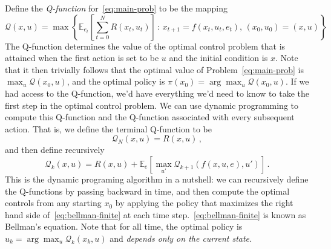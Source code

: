 \documentclass[11pt]{article}
\newcommand{\eq}[1]{\eqref{eq:#1}}
\newcommand{\eqd}[1]{\eqref{eq:#1}}
\numberwithin{equation}{section}
\newcommand{\E}{\mathbb{E}}
\begin{document}
Define the \emph{Q-function} for~\eq{main-prob} to be the mapping 
\begin{equation}\label{eq:q-fun}
	\mathcal{Q}(x,u) = \max\left\{ \E_{e_t}\left[ \sum_{t=0}^N R(x_t,u_t)\right] \,:\,x_{t+1} = f(x_t, u_t, e_t),\,(x_0,u_0)=(x,u)\right\}
\end{equation}
The Q-function determines the value of the optimal control problem that is attained when the first action is set to be $u$ and the initial condition is $x$. Note that it then trivially follows that the optimal value of Problem~\eqd{main-prob} is $\max_u \mathcal{Q}(x_0,u)$, and the optimal policy is $\pi(x_0) = \arg \max_u \mathcal{Q}(x_0,u)$. If we had access to the Q-function, we'd have everything we'd need to know to take the first step in the optimal control problem. We can use dynamic programming to compute this Q-function and the Q-function associated with every subsequent action. That is, we define the terminal Q-function to be
\begin{equation*}
	\mathcal{Q}_{N}(x,u) = R(x,u)\,,
\end{equation*}
and then define recursively
\begin{equation}\label{eq:bellman-finite}
	\mathcal{Q}_{k}(x,u) =R(x,u) + \E_{e}\left[ \max_{u'} \mathcal{Q}_{k+1}(f(x,u,e),u')\right]\,.
\end{equation}
This is the dynamic programing algorithm in a nutshell: we can recursively define the Q-functions by passing backward in time, and then compute the optimal controls from any starting $x_0$ by applying the policy that maximizes the right hand side of~\eq{bellman-finite} at each time step.~\eq{bellman-finite} is known as Bellman's equation. Note that for all time, the optimal policy is $u_k = \arg\max_u \mathcal{Q}_k (x_k,u)$ and \emph{depends only on the current state.}
\end{document}
